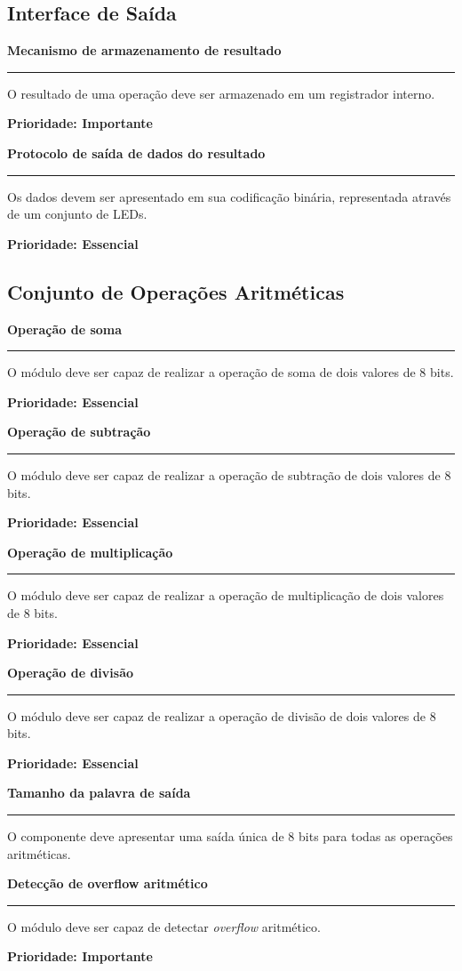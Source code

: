 \documentclass{article}
\begin{document}
  \subsection{Interface de Saída}
  
    \begin{functional}
     \item \textbf{Mecanismo de armazenamento de resultado}\hrule
     O resultado de uma operação deve ser armazenado em um registrador interno.

     \textbf{Prioridade: Importante}

      \item \textbf{Protocolo de saída de dados do resultado}\hrule
      Os dados devem ser apresentado em sua codificação binária, representada através de um conjunto de LEDs.
     
     \textbf{Prioridade: Essencial} 

    \end{functional}  

  \subsection{Conjunto de Operações Aritméticas} 
  
    \begin{functional}
      \item \textbf{Operação de soma}\hrule
      O módulo deve ser capaz de realizar a operação de soma de dois valores de 8 bits.

      \textbf{Prioridade: Essencial}

      \item \textbf{Operação de subtração}\hrule
      O módulo deve ser capaz de realizar a operação de subtração de dois valores de 8 bits.

      \textbf{Prioridade: Essencial}

      \item \textbf{Operação de multiplicação}\hrule
      O módulo deve ser capaz de realizar a operação de multiplicação de dois valores de 8 bits. 

      \textbf{Prioridade: Essencial}

      \item \textbf{Operação de divisão}\hrule
      O módulo deve ser capaz de realizar a operação de divisão de dois valores de 8 bits.

      \textbf{Prioridade: Essencial}      

      \item \textbf{Tamanho da palavra de saída}\hrule
      O componente deve apresentar uma saída única de 8 bits para todas as operações aritméticas.

     \item \textbf{Detecção de overflow aritmético}\hrule
     O módulo deve ser capaz de detectar \textit{overflow} aritmético.

     \textbf{Prioridade: Importante}
    \end{functional}
\end{document}
